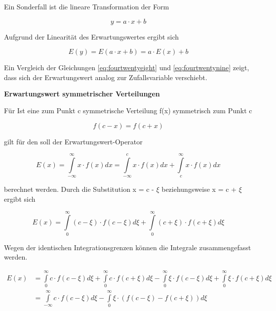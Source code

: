 \noindent Ein Sonderfall ist die lineare Transformation der Form 

\begin{equation}\label{eq:fourtwentyeight}
y=a\cdot x+b
\end{equation}

\noindent Aufgrund der Linearit\"{a}t des Erwartungswertes ergibt sich 

\begin{equation}\label{eq:fourtwentynine}
E(y)=E(a\cdot x+b)=a\cdot E(x)+b
\end{equation}

\noindent Ein Vergleich der Gleichungen \eqref{eq:fourtwentyeight} und \eqref{eq:fourtwentynine} zeigt, dass sich der Erwartungswert analog zur Zufallsvariable verschiebt. \bigskip

{\selectfont
\noindent\textbf{Erwartungswert symmetrischer Verteilungen}}\smallskip

\noindent F\"{u}r Ist eine zum Punkt c symmetrische Verteilung f(x) symmetrisch zum Punkt c

\begin{equation}\label{eq:fourthirty}
f(c-x)=f(c+x)
\end{equation}

\noindent gilt f\"{u}r den soll der Erwartungswert-Operator

\begin{equation}\label{eq:fourthirtyone}
E(x)=\int\limits _{-\infty }^{\infty }x\cdot f(x)dx =\int\limits _{-\infty }^{c}x\cdot f(x)dx +\int\limits _{c}^{\infty }x\cdot f(x)dx
\end{equation}

\noindent berechnet werden. Durch die Substitution x = c - $\xi$ beziehungsweise x = c + $\xi$ ergibt sich

\begin{equation}\label{eq:fourthirtytwo}
E(x)=\int\limits _{0}^{\infty }(c-\xi )\cdot f(c-\xi )d\xi  +\int\limits _{0}^{\infty }(c+\xi )\cdot f(c+\xi )d\xi
\end{equation}

\noindent Wegen der identischen Integrationsgrenzen k\"{o}nnen die Integrale zusammengefasst werden.

\begin{equation}\label{eq:fourthirtythree}
\begin{split}
E(x) & = \int\limits _{0}^{\infty }c\cdot f(c-\xi)d\xi  +\int\limits _{0}^{\infty }c\cdot f(c+\xi)d\xi  -\int\limits _{0}^{\infty }\xi \cdot f(c-\xi )d\xi  +\int\limits _{0}^{\infty }\xi \cdot f(c+\xi)d\xi\\
& =  \int\limits _{-\infty}^{\infty }c\cdot f(c-\xi)d\xi - \int\limits _{0}^{\infty }\xi\cdot (f(c-\xi)  -  f(c+\xi ))d\xi
\end{split}
\end{equation}

